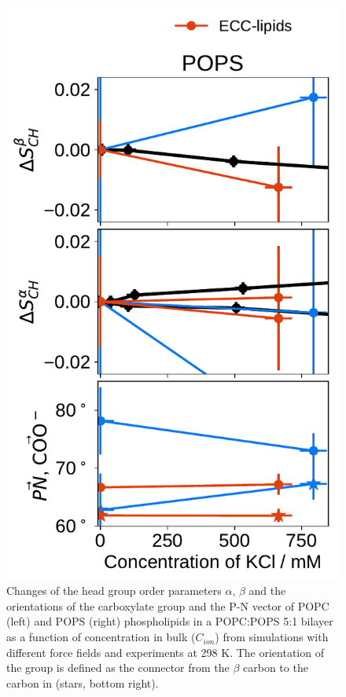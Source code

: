 \begin{figure}[tbp!]
  \includegraphics[width=\figwidthsmall]{../img/ecc_pops/order_parameters_changes_ecc-lip_L14_A-B-PN-COO_POPS_kcl.pdf} 
  \caption{\label{fig:delta_ordPar_KCl_PCPS} 
    Changes of the head group order parameters $\alpha$, $\beta$ and the orientations of the carboxylate group and the P-N vector  
    of POPC (left) and POPS (right) phospholipids in a POPC:POPS 5:1 bilayer as a function of  concentration 
    in bulk ($C_{ion}$) from simulations with different force fields and experiments at 298 K. \citep{roux90}
    The orientation of the  group is defined as 
    the connector from the $\beta$ carbon to the carbon in  (stars, bottom right). 
  } 
\end{figure} 
 


